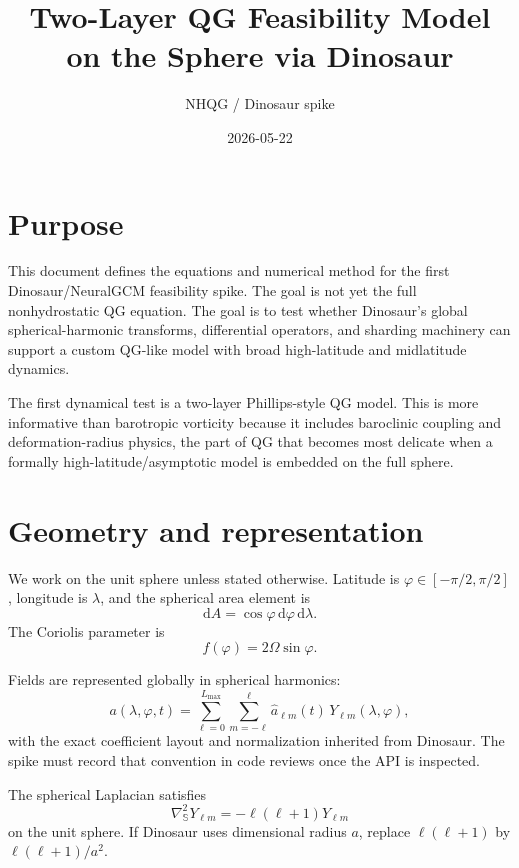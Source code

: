 \documentclass[11pt]{article}
\title{Two-Layer QG Feasibility Model on the Sphere via Dinosaur}
\author{NHQG / Dinosaur spike}
\date{2026-05-22}
\newcommand{\dd}{\mathrm{d}}
\newcommand{\lapS}{\nabla_{\mathbb{S}}^{2}}
\newcommand{\Ylm}{Y_{\ell m}}
\begin{document}
\maketitle

\section{Purpose}

This document defines the equations and numerical method for the first
Dinosaur/NeuralGCM feasibility spike.  The goal is not yet the full
nonhydrostatic QG equation.  The goal is to test whether Dinosaur's
global spherical-harmonic transforms, differential operators, and sharding
machinery can support a custom QG-like model with broad high-latitude and
midlatitude dynamics.

The first dynamical test is a two-layer Phillips-style QG model.  This is
more informative than barotropic vorticity because it includes baroclinic
coupling and deformation-radius physics, the part of QG that becomes most
delicate when a formally high-latitude/asymptotic model is embedded on the
full sphere.

\section{Geometry and representation}

We work on the unit sphere unless stated otherwise.  Latitude is
$\varphi \in [-\pi/2,\pi/2]$, longitude is $\lambda$, and the spherical
area element is
\begin{equation}
  \dd A = \cos\varphi\,\dd\varphi\,\dd\lambda.
\end{equation}
The Coriolis parameter is
\begin{equation}
  f(\varphi) = 2\Omega\sin\varphi.
\end{equation}

Fields are represented globally in spherical harmonics:
\begin{equation}
  a(\lambda,\varphi,t)
  = \sum_{\ell=0}^{L_{\max}}\sum_{m=-\ell}^{\ell}
  \widehat{a}_{\ell m}(t)\,\Ylm(\lambda,\varphi),
\end{equation}
with the exact coefficient layout and normalization inherited from
Dinosaur.  The spike must record that convention in code reviews once the
API is inspected.

The spherical Laplacian satisfies
\begin{equation}
  \lapS \Ylm = -\ell(\ell+1)\Ylm
\end{equation}
on the unit sphere.  If Dinosaur uses dimensional radius $a$, replace
$\ell(\ell+1)$ by $\ell(\ell+1)/a^{2}$.
\end{document}
